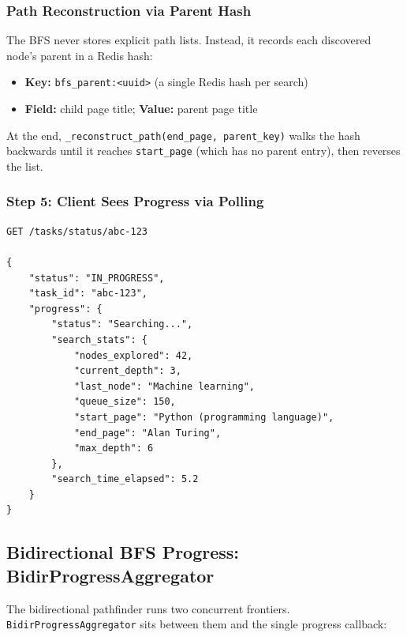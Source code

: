\documentclass[11pt,a4paper]{article}
\begin{document}
\subsubsection{Path Reconstruction via Parent Hash}

The BFS never stores explicit path lists. Instead, it records each discovered node's parent in a Redis hash:
\begin{itemize}[leftmargin=*, nosep]
    \item \textbf{Key:} \texttt{bfs\_parent:<uuid>} (a single Redis hash per search)
    \item \textbf{Field:} child page title; \textbf{Value:} parent page title
\end{itemize}

At the end, \texttt{\_reconstruct\_path(end\_page, parent\_key)} walks the hash backwards until it reaches \texttt{start\_page} (which has no parent entry), then reverses the list.

\subsubsection{Step 5: Client Sees Progress via Polling}

\begin{lstlisting}[caption=Client Polling Response]
GET /tasks/status/abc-123

{
    "status": "IN_PROGRESS",
    "task_id": "abc-123",
    "progress": {
        "status": "Searching...",
        "search_stats": {
            "nodes_explored": 42,
            "current_depth": 3,
            "last_node": "Machine learning",
            "queue_size": 150,
            "start_page": "Python (programming language)",
            "end_page": "Alan Turing",
            "max_depth": 6
        },
        "search_time_elapsed": 5.2
    }
}
\end{lstlisting}

\subsection{Bidirectional BFS Progress: BidirProgressAggregator}

The bidirectional pathfinder runs two concurrent frontiers. \texttt{BidirProgressAggregator} sits between them and the single progress callback:
\end{document}
